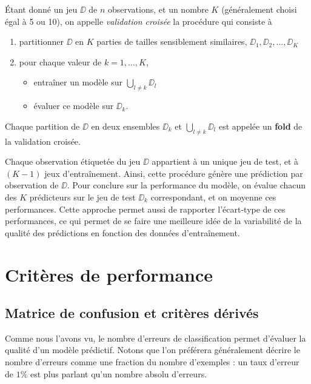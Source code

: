 Étant donné un jeu $\DD$ de $n$ observations, et un nombre $K$ (généralement
choisi égal à 5 ou 10), on appelle {\it validation croisée} la procédure qui
consiste à
\begin{enumerate}
\item partitionner $\DD$ en $K$ parties de tailles sensiblement similaires,
  $\DD_1, \DD_2, \dots, \DD_K$
\item pour chaque valeur de $k=1, \dots, K$,
  \begin{itemize}
  \item entraîner un modèle sur $\bigcup_{l \neq k} \DD_l$
  \item évaluer ce modèle sur $\DD_k$.
  \end{itemize}
\end{enumerate}
Chaque partition de $\DD$ en deux ensembles $\DD_k$ et $\bigcup_{l \neq
  k} \DD_l$ est appelée un \textbf{fold} de la validation croisée.

Chaque observation étiquetée du jeu $\DD$ appartient à un unique jeu de test,
et à $(K-1)$ jeux d'entraînement. Ainsi, cette procédure génère une prédiction
par observation de $\DD$. Pour conclure sur la performance du modèle, on évalue
chacun des $K$ prédicteurs sur le jeu de test $\DD_k$ correspondant, et on
moyenne ces performances. Cette approche permet aussi de rapporter l'écart-type
de ces performances, ce qui permet de se faire une meilleure idée de la
variabilité de la qualité des prédictions en fonction des données
d'entraînement.

\section{Critères de performance}
\subsection{Matrice de confusion et critères dérivés}
\label{sec:confusion_matrix}
Comme nous l'avons vu, le nombre d'erreurs de classification permet d'évaluer
la qualité d'un modèle prédictif. Notons que l'on préférera généralement
décrire le nombre d'erreurs comme une fraction du nombre d'exemples : un taux
d'erreur de $1\%$ est plus parlant qu'un nombre absolu d'erreurs.
 
